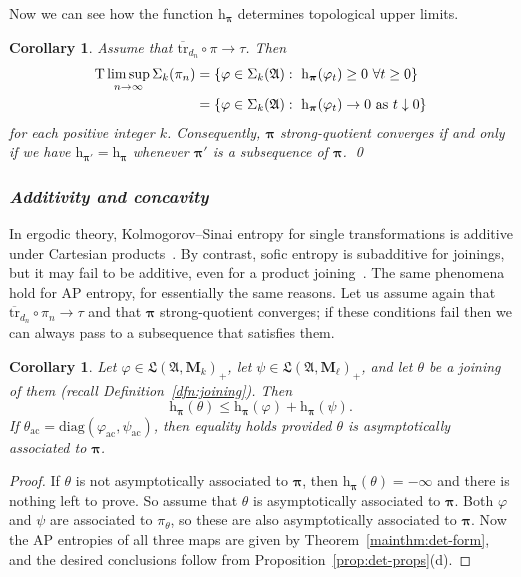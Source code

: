 \documentclass[12pt,a4paper]{article}
\numberwithin{equation}{section}
\newtheorem{cor}[thm]{Corollary}
\theoremstyle{remark}
\renewcommand{\rm}[1]{\mathrm{#1}}
\newcommand{\rmM}{\mathbf{M}}
\newcommand{\rmh}{\mathrm{h}}
\newcommand{\A}{\mathfrak{A}}
\newcommand{\frL}{\mathfrak{L}}
\renewcommand{\S}{\Sigma}
\renewcommand{\phi}{\varphi}
\newcommand{\bspi}{\boldsymbol{\pi}}
\newcommand{\tr}{\overline{\mathrm{tr}}}
\begin{document}
Now we can see how the function $\rmh_{\bspi}$ determines topological upper limits.

\begin{cor}\label{cor:h-pi-and-strong-quot}
Assume that $\tr_{d_n}\circ \pi \to\tau$.  Then
\begin{align*}
\rm{T}\limsup_{n\to\infty} \S_k(\pi_n) &= \{\phi \in \S_k(\A):\ \rmh_{\bspi}(\phi_t) \ge 0\ \forall t \ge 0\}\\
&= \{\phi \in \S_k(\A):\ \rmh_{\bspi}(\phi_t) \to 0\ \hbox{as}\ t\downarrow 0\}
\end{align*} 
for each positive integer $k$. Consequently, $\bspi$ strong-quotient converges if and only if we have $\rmh_{\bspi'} = \rmh_{\bspi}$ whenever $\bspi'$ is a subsequence of $\bspi$. \qed
\end{cor}


\subsubsection*{\emph{Additivity and concavity}}

In ergodic theory, Kolmogorov--Sinai entropy for single transformations is additive under Cartesian products~\cite[Thm. 4.23]{Walters--book}.  By contrast, sofic entropy is subadditive for joinings, but it may fail to be additive, even for a product joining~\cite{Aus--soficentadd}.  The same phenomena hold for AP entropy, for essentially the same reasons.  Let us assume again that $\tr_{d_n}\circ \pi_n \to \tau$ and that $\bspi$ strong-quotient converges; if these conditions fail then we can always pass to a subsequence that satisfies them.  

\begin{cor}\label{cor:AP-ent-subadd}
Let $\phi \in \frL(\A,\rmM_k)_+$, let $\psi \in \frL(\A,\rmM_\ell)_+$, and let $\theta$ be a joining of them (recall Definition~\ref{dfn:joining}).  Then
\begin{equation}\label{eq:AP-ent-subadd}
\rmh_{\bspi}(\theta) \le \rmh_{\bspi}(\phi) + \rmh_{\bspi}(\psi).
\end{equation}
If $\theta_{\rm{ac}} = \rm{diag}(\phi_{\rm{ac}},\psi_{\rm{ac}})$, then equality holds provided $\theta$ is asymptotically associated to $\bspi$.
\end{cor}

\begin{proof}
If $\theta$ is not asymptotically associated to $\bspi$, then $\rmh_{\bspi}(\theta) = -\infty$ and there is nothing left to prove.  So assume that $\theta$ is asymptotically associated to $\bspi$.  Both $\phi$ and $\psi$ are associated to $\pi_\theta$, so these are also asymptotically associated to $\bspi$.  Now the AP entropies of all three maps are given by Theorem~\ref{mainthm:det-form}, and the desired conclusions follow from Proposition~\ref{prop:det-props}(d).
\end{proof}
\end{document}
